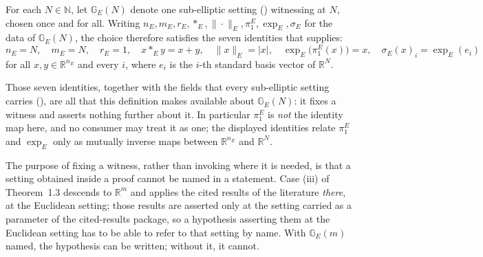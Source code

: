 \begin{definition}
For each $N\in\mathbb N$, let $\mathbb G_E(N)$ denote one sub-elliptic setting
() witnessing  at $N$, chosen
once and for all. Writing $n_E,m_E,r_E,*_E,\|\cdot\|_E,\pi_1^E,\exp_E,\sigma_E$ for the data
of $\mathbb G_E(N)$, the choice therefore satisfies the seven identities that
 supplies:
\[
 n_E=N,\quad m_E=N,\quad r_E=1,\quad x*_Ey=x+y,\quad \|x\|_E=|x|,\quad
 \exp_E\big(\pi_1^E(x)\big)=x,\quad \sigma_E(x)_i=\exp_E(e_i)
\]
for all $x,y\in\mathbb R^{n_E}$ and every $i$, where $e_i$ is the $i$-th standard basis
vector of $\mathbb R^{N}$.

Those seven identities, together with the fields that every sub-elliptic setting carries
(), are all that this definition makes available about
$\mathbb G_E(N)$: it fixes a witness and asserts nothing further about it. In particular
$\pi_1^E$ is \emph{not} the identity map here, and no consumer may treat it as one; the
displayed identities relate $\pi_1^E$ and $\exp_E$ only as mutually inverse maps between
$\mathbb R^{n_E}$ and $\mathbb R^{N}$.

The purpose of fixing a witness, rather than invoking
 where it is needed, is that a setting obtained inside
a proof cannot be named in a statement. Case (iii) of Theorem~1.3 descends to $\mathbb R^{m}$
and applies the cited results of the literature \emph{there}, at the Euclidean setting; those
results are asserted only at the setting carried as a parameter of the cited-results package,
so a hypothesis asserting them at the Euclidean setting has to be able to refer to that
setting by name. With $\mathbb G_E(m)$ named, the hypothesis can be written; without it, it cannot.
\end{definition}
